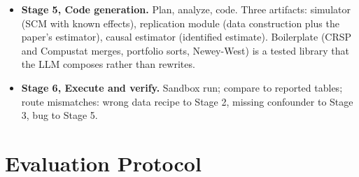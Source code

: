 \begin{itemize}
    \begin{itemize}
    \tightlist
    \item
      enforce acyclicity, handle feedback by time-indexing
    \item
      run identification of \(\tau\) from \(G\)
    \item
      compare the theory DAG with the empirical specification (the
      automated factor mirage diagnostic)
    \item
      list implied conditional independencies
    \end{itemize}
  \item
    \textbf{Stage 5, Code generation.} Plan, analyze, code. Three
    artifacts: simulator (SCM with known effects), replication module
    (data construction plus the paper's estimator), causal estimator
    (identified estimate). Boilerplate (CRSP and Compustat merges,
    portfolio sorts, Newey-West) is a tested library that the LLM composes
    rather than rewrites.
  \item
    \textbf{Stage 6, Execute and verify.} Sandbox run; compare to reported
    tables; route mismatches: wrong data recipe to Stage 2, missing
    confounder to Stage 3, bug to Stage 5.
  \end{itemize}

  \section{Evaluation Protocol}\label{sec:evaluation}

